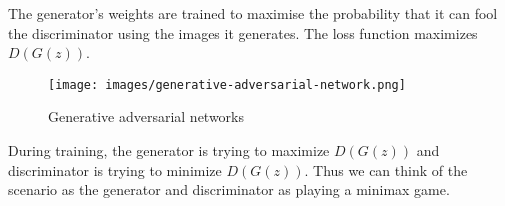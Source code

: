 \begin{onehalfspace}
    The generator's weights are trained to maximise the probability that it can 
    fool the discriminator using the images it generates. The loss function 
    maximizes \(D(G(z))\).

    \begin{figure}[h]
        \centering
        \texttt{[image: images/generative-adversarial-network.png]}
        \caption{Generative adversarial networks \cite{gan_image}}
    \end{figure} 

    During training, the generator is trying to maximize \(D(G(z))\) and 
    discriminator is trying to minimize \(D(G(z))\).  Thus we can think of the 
    scenario as the generator and discriminator as playing a minimax game.


\end{onehalfspace}


